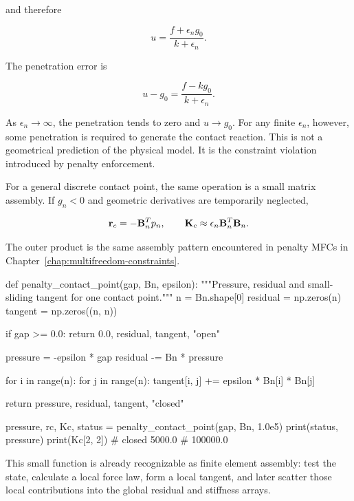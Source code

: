 and therefore

\begin{equation}\label{contact-1d-penalty-displacement}
    u = \frac{f + \epsilon_n g_0}{k+\epsilon_n}.
\end{equation}

The penetration error is

\begin{equation}\label{contact-1d-penalty-penetration}
    u-g_0 = \frac{f-k g_0}{k+\epsilon_n}.
\end{equation}

As $ \epsilon_n \rightarrow \infty $, the penetration tends to zero and
$ u \rightarrow g_0 $. For any finite $ \epsilon_n $, however, some penetration
is required to generate the contact reaction. This is not a geometrical prediction
of the physical model. It is the constraint violation introduced by penalty
enforcement.


For a general discrete contact point, the same operation is a small matrix
assembly. If $g_n<0$ and geometric derivatives are temporarily neglected,

\begin{equation}
    \mathbf{r}_c=-\mathbf{B}_n^T p_n,
    \qquad
    \mathbf{K}_c\approx\epsilon_n\mathbf{B}_n^T\mathbf{B}_n.
\end{equation}

The outer product is the same assembly pattern encountered in penalty MFCs in
Chapter~\ref{chap:multifreedom-constraints}.

\begin{python}
def penalty_contact_point(gap, Bn, epsilon):
    """Pressure, residual and small-sliding tangent for one contact point."""
    n = Bn.shape[0]
    residual = np.zeros(n)
    tangent = np.zeros((n, n))

    if gap >= 0.0:
        return 0.0, residual, tangent, "open"

    pressure = -epsilon * gap
    residual -= Bn * pressure

    for i in range(n):
        for j in range(n):
            tangent[i, j] += epsilon * Bn[i] * Bn[j]

    return pressure, residual, tangent, "closed"


pressure, rc, Kc, status = penalty_contact_point(gap, Bn, 1.0e5)
print(status, pressure)
print(Kc[2, 2])
# closed 5000.0
# 100000.0
\end{python}

This small function is already recognizable as finite element assembly: test
the state, calculate a local force law, form a local tangent, and later scatter
those local contributions into the global residual and stiffness arrays.

